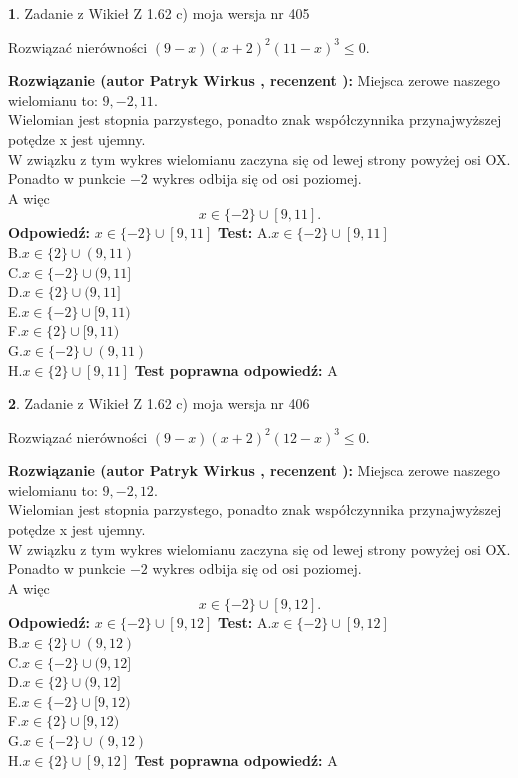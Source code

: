 \documentclass[12pt, a4paper]{article}
\theoremstyle{definition} %
\newtheorem{zad}{}
\newcommand{\zadStart}[1]{\begin{zad}#1\newline}
\newcommand{\zadStop}{\end{zad}}
\newcommand{\rozwStart}[2]{\noindent \textbf{Rozwiązanie (autor #1 , recenzent #2): }\newline}
\newcommand{\rozwStop}{\newline}
\newcommand{\odpStart}{\noindent \textbf{Odpowiedź:}\newline}
\newcommand{\odpStop}{\newline}
\newcommand{\testStart}{\noindent \textbf{Test:}\newline}
\newcommand{\testStop}{\newline}
\newcommand{\kluczStart}{\noindent \textbf{Test poprawna odpowiedź:}\newline}
\newcommand{\kluczStop}{\newline}
\begin{document}
\zadStart{Zadanie z Wikieł Z 1.62 c) moja wersja nr 405}

Rozwiązać nierówności $(9-x)(x+2)^{2}(11-x)^{3}\le0$.
\zadStop
\rozwStart{Patryk Wirkus}{}
Miejsca zerowe naszego wielomianu to: $9, -2, 11$.\\
Wielomian jest stopnia parzystego, ponadto znak współczynnika przy\linebreak najwyższej potędze x jest ujemny.\\ W związku z tym wykres wielomianu zaczyna się od lewej strony powyżej osi OX.\\
Ponadto w punkcie $-2$ wykres odbija się od osi poziomej.\\
A więc $$x \in \{-2\} \cup [9,11].$$
\rozwStop
\odpStart
$x \in \{-2\} \cup [9,11]$
\odpStop
\testStart
A.$x \in \{-2\} \cup [9,11]$\\
B.$x \in \{2\} \cup (9,11)$\\
C.$x \in \{-2\} \cup (9,11]$\\
D.$x \in \{2\} \cup (9,11]$\\
E.$x \in \{-2\} \cup [9,11)$\\
F.$x \in \{2\} \cup [9,11)$\\
G.$x \in \{-2\} \cup (9,11)$\\
H.$x \in \{2\} \cup [9,11]$
\testStop
\kluczStart
A
\kluczStop



\zadStart{Zadanie z Wikieł Z 1.62 c) moja wersja nr 406}

Rozwiązać nierówności $(9-x)(x+2)^{2}(12-x)^{3}\le0$.
\zadStop
\rozwStart{Patryk Wirkus}{}
Miejsca zerowe naszego wielomianu to: $9, -2, 12$.\\
Wielomian jest stopnia parzystego, ponadto znak współczynnika przy\linebreak najwyższej potędze x jest ujemny.\\ W związku z tym wykres wielomianu zaczyna się od lewej strony powyżej osi OX.\\
Ponadto w punkcie $-2$ wykres odbija się od osi poziomej.\\
A więc $$x \in \{-2\} \cup [9,12].$$
\rozwStop
\odpStart
$x \in \{-2\} \cup [9,12]$
\odpStop
\testStart
A.$x \in \{-2\} \cup [9,12]$\\
B.$x \in \{2\} \cup (9,12)$\\
C.$x \in \{-2\} \cup (9,12]$\\
D.$x \in \{2\} \cup (9,12]$\\
E.$x \in \{-2\} \cup [9,12)$\\
F.$x \in \{2\} \cup [9,12)$\\
G.$x \in \{-2\} \cup (9,12)$\\
H.$x \in \{2\} \cup [9,12]$
\testStop
\kluczStart
A
\kluczStop
\end{document}
